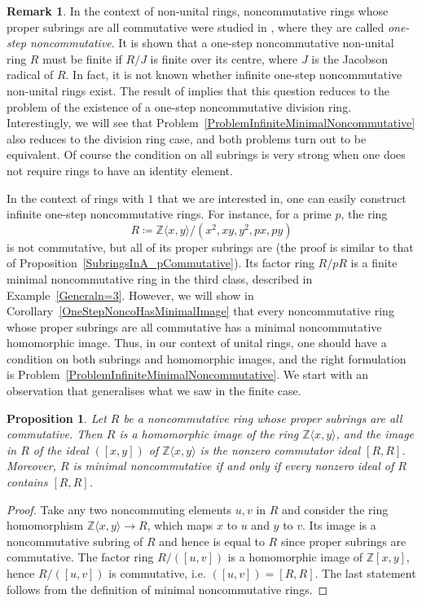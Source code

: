 \documentclass[11pt]{article}
\newtheorem{proposition}[corollary]{Proposition}
\theoremstyle{definition}
\newtheorem{remark}[corollary]{Remark}
\begin{document}
\begin{remark}
In the context of non-unital rings, noncommutative rings whose proper subrings are all commutative were studied in \cite{Ikeda_OneStepNoncommutative}, where they are called \textit{one-step noncommutative}. It is shown that a one-step noncommutative non-unital ring $R$ must be finite if $R/J$ is finite over its centre, where $J$ is the Jacobson radical of $R$. In fact, it is not known whether infinite one-step noncommutative non-unital rings exist. The result of \cite{Ikeda_OneStepNoncommutative} implies that this question reduces to the problem of the existence of a one-step noncommutative division ring. Interestingly, we will see that Problem~\ref{ProblemInfiniteMinimalNoncommutative} also reduces to the division ring case, and both problems turn out to be equivalent. Of course the condition on all subrings is very strong when one does not require rings to have an identity element.
\end{remark}

In the context of rings with $1$ that we are interested in, one can easily construct infinite one-step noncommutative rings. For instance, for a prime $p$, the ring
\[R\coloneqq\mathbb{Z}\langle x,y\rangle/\left(x^2,xy,y^2,px,py\right)\]
is not commutative, but all of its proper subrings are (the proof is similar to that of Proposition~\ref{SubringsInA_pCommutative}). Its factor ring $R/pR$ is a finite minimal noncommutative ring in the third class, described in Example~\ref{Generaln=3}. However, we will show in Corollary~\ref{OneStepNoncoHasMinimalImage} that every noncommutative ring whose proper subrings are all commutative has a minimal noncommutative homomorphic image. Thus, in our context of unital rings, one should have a condition on both subrings and homomorphic images, and the right formulation is Problem~\ref{ProblemInfiniteMinimalNoncommutative}. We start with an observation that generalises what we saw in the finite case.

\begin{proposition}\label{A22Jul22}
Let $R$ be a noncommutative ring whose proper subrings are all commutative. Then $R$ is a homomorphic image of the ring $\mathbb{Z}\langle x,y\rangle$, and the image in $R$ of the ideal $([x,y])$ of $\mathbb{Z}\langle x,y\rangle$ is the nonzero commutator ideal $[R,R]$. Moreover, $R$ is minimal noncommutative if and only if every nonzero ideal of $R$ contains $[R,R]$.
\end{proposition}

\begin{proof}
Take any two noncommuting elements $u,v$ in $R$ and consider the ring homomorphism $\mathbb{Z}\langle x,y\rangle\to R$, which maps $x$ to $u$ and $y$ to $v$. Its image is a noncommutative subring of $R$ and hence is equal to $R$ since proper subrings are commutative. The factor ring $R/([u,v])$ is a homomorphic image of $\mathbb{Z}[x,y]$, hence $R/([u,v])$ is commutative, i.e. $([u,v])=[R,R]$. The last statement follows from the definition of minimal noncommutative rings.
\end{proof}
\end{document}
